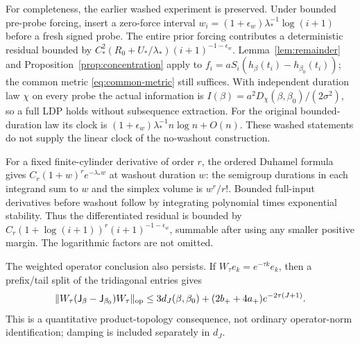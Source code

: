For completeness, the earlier washed experiment is preserved. Under bounded
pre-probe forcing, insert a zero-force interval
$w_i=(1+\epsilon_w)\lambda_*^{-1}\log(i+1)$ before a fresh signed probe.
The entire prior forcing contributes a deterministic residual bounded by
$C_*^2(R_0+U_*/\lambda_*)(i+1)^{-1-\epsilon_w}$. Lemma~\ref{lem:remainder}
and Proposition~\ref{prop:concentration} apply to
$f_i=aS_i(h_\beta(t_i)-h_{\beta_0}(t_i))$; the common metric
\eqref{eq:common-metric} still suffices. With independent duration law $\chi$
on every probe the actual information is
$I(\beta)=a^2D_\chi(\beta,\beta_0)/(2\sigma^2)$, so a full LDP holds without
subsequence extraction. For the original bounded-duration law its clock is
$(1+\epsilon_w)\lambda_*^{-1}n\log n+O(n)$. These washed statements do not
supply the linear clock of the no-washout construction.

For a fixed finite-cylinder derivative of order $r$, the ordered Duhamel
formula gives $C_r(1+w)^re^{-\lambda_*w}$ at washout duration $w$: the
semigroup durations in each integrand sum to $w$ and the simplex volume is
$w^r/r!$. Bounded full-input derivatives before washout follow by integrating
polynomial times exponential stability. Thus the differentiated residual is
bounded by $C_r(1+\log(i+1))^r(i+1)^{-1-\epsilon_w}$, summable after using any
smaller positive margin. The logarithmic factors are not omitted.

The weighted operator conclusion also persists. If $W_\tau e_k=e^{-\tau k}e_k$,
then a prefix/tail split of the tridiagonal entries gives
\[
 \|W_\tau(\mathsf J_\beta-\mathsf J_{\beta_0})W_\tau\|_{\mathrm{op}}
 \le3d_J(\beta,\beta_0)+(2b_++4a_+)e^{-2\tau(J+1)}.
\]
This is a quantitative product-topology consequence, not ordinary operator-norm
identification; damping is included separately in $d_J$.

